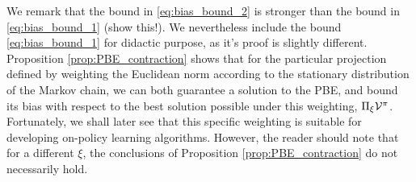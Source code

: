 We remark that the bound in \eqref{eq:bias_bound_2} is stronger than the bound in  \eqref{eq:bias_bound_1} (show this!). We nevertheless include the bound \eqref{eq:bias_bound_1} for didactic purpose, as it's proof is slightly different.
Proposition \ref{prop:PBE_contraction} shows that for the particular projection defined by weighting the Euclidean norm according to the stationary distribution of the Markov chain, we can both guarantee a solution to the PBE, and bound its bias with respect to the best solution possible under this weighting, $\Pi_\xi \mathcal{V}^\pi$. Fortunately, we shall later see that this specific weighting is suitable for developing on-policy learning algorithms. However, the reader should note that for a different $\xi$, the conclusions of Proposition \ref{prop:PBE_contraction} do not necessarily hold.

